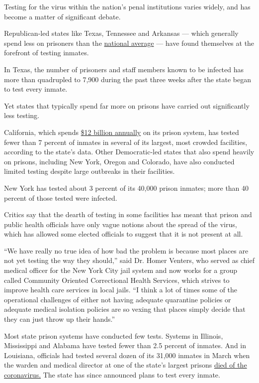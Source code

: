 Testing for the virus within the nation's penal institutions varies
widely, and has become a matter of significant debate.

Republican-led states like Texas, Tennessee and Arkansas --- which
generally spend less on prisoners than the
\href{https://www.vera.org/publications/price-of-prisons-2015-state-spending-trends/price-of-prisons-2015-state-spending-trends/price-of-prisons-2015-state-spending-trends-prison-spending}{national
average} --- have found themselves at the forefront of testing inmates.

In Texas, the number of prisoners and staff members known to be infected
has more than quadrupled to 7,900 during the past three weeks after the
state began to test every inmate.

Yet states that typically spend far more on prisons have carried out
significantly less testing.

California, which spends \href{https://www.cdcr.ca.gov/budget/}{\$12
billion annually} on its prison system, has tested fewer than 7 percent
of inmates in several of its largest, most crowded facilities, according
to the state's data. Other Democratic-led states that also spend heavily
on prisons, including New York, Oregon and Colorado, have also conducted
limited testing despite large outbreaks in their facilities.

New York has tested about 3 percent of its 40,000 prison inmates; more
than 40 percent of those tested were infected.

Critics say that the dearth of testing in some facilities has meant that
prison and public health officials have only vague notions about the
spread of the virus, which has allowed some elected officials to suggest
that it is not present at all.

``We have really no true idea of how bad the problem is because most
places are not yet testing the way they should,'' said Dr. Homer
Venters, who served as chief medical officer for the New York City jail
system and now works for a group called Community Oriented Correctional
Health Services, which strives to improve health care services in local
jails. ``I think a lot of times some of the operational challenges of
either not having adequate quarantine policies or adequate medical
isolation policies are so vexing that places simply decide that they can
just throw up their hands.''

Most state prison systems have conducted few tests. Systems in Illinois,
Mississippi and Alabama have tested fewer than 2.5 percent of inmates.
And in Louisiana, officials had tested several dozen of its 31,000
inmates in March when the warden and medical director at one of the
state's largest prisons
\href{https://www.theadvocate.com/baton_rouge/news/coronavirus/article_2c8b1d96-7074-11ea-8eb7-57170ff59a6d.html}{died
of the coronavirus.} The state has since announced plans to test every
inmate.

